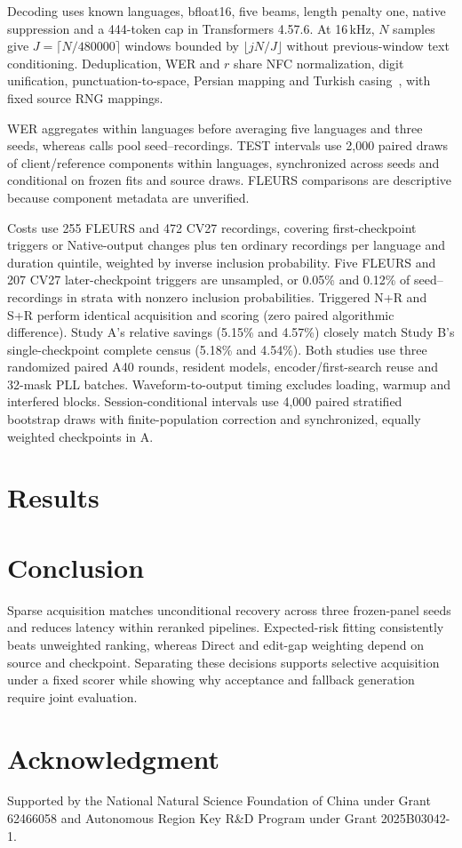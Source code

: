 \documentclass[conference,letterpaper]{IEEEtran}
\begin{document}
Decoding uses known languages, bfloat16, five beams, length penalty one, native suppression and a 444-token cap in Transformers 4.57.6. At 16\,kHz, $N$ samples give $J=\lceil N/480000\rceil$ windows bounded by $\lfloor jN/J\rfloor$ without previous-window text conditioning. Deduplication, WER and $r$ share NFC normalization, digit unification, punctuation-to-space, Persian mapping and Turkish casing~\cite{normalization}, with fixed source RNG mappings.

WER aggregates within languages before averaging five languages and three seeds, whereas calls pool seed--recordings. TEST intervals use 2,000 paired draws of client/reference components within languages, synchronized across seeds and conditional on frozen fits and source draws. FLEURS comparisons are descriptive because component metadata are unverified.

Costs use 255 FLEURS and 472 CV27 recordings, covering first-checkpoint triggers or Native-output changes plus ten ordinary recordings per language and duration quintile, weighted by inverse inclusion probability. Five FLEURS and 207 CV27 later-checkpoint triggers are unsampled, or 0.05\% and 0.12\% of seed--recordings in strata with nonzero inclusion probabilities. Triggered N+R and S+R perform identical acquisition and scoring (zero paired algorithmic difference). Study A's relative savings (5.15\% and 4.57\%) closely match Study B's single-checkpoint complete census (5.18\% and 4.54\%). Both studies use three randomized paired A40 rounds, resident models, encoder/first-search reuse and 32-mask PLL batches. Waveform-to-output timing excludes loading, warmup and interfered blocks. Session-conditional intervals use 4,000 paired stratified bootstrap draws with finite-population correction and synchronized, equally weighted checkpoints in A.

\section{Results}

\section{Conclusion}
Sparse acquisition matches unconditional recovery across three frozen-panel seeds and reduces latency within reranked pipelines. Expected-risk fitting consistently beats unweighted ranking, whereas Direct and edit-gap weighting depend on source and checkpoint. Separating these decisions supports selective acquisition under a fixed scorer while showing why acceptance and fallback generation require joint evaluation.
\section*{Acknowledgment}
Supported by the National Natural Science Foundation of China under Grant 62466058 and Autonomous Region Key R\&D Program under Grant 2025B03042-1.
\label{iscas:body-end}\clearpage\raggedbottom\balance
\label{iscas:references-start}

\end{document}
